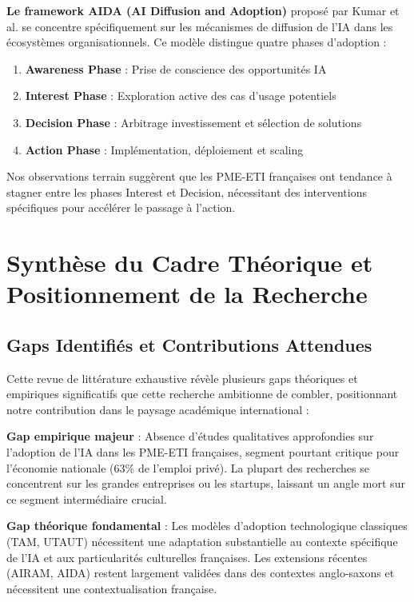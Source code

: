 \textbf{Le framework AIDA (AI Diffusion and Adoption)} proposé par Kumar et al. \cite{kumar2024aida} se concentre spécifiquement sur les mécanismes de diffusion de l'IA dans les écosystèmes organisationnels. Ce modèle distingue quatre phases d'adoption :

\begin{enumerate}
    \item \textbf{Awareness Phase} : Prise de conscience des opportunités IA
    \item \textbf{Interest Phase} : Exploration active des cas d'usage potentiels  
    \item \textbf{Decision Phase} : Arbitrage investissement et sélection de solutions
    \item \textbf{Action Phase} : Implémentation, déploiement et scaling
\end{enumerate}

Nos observations terrain suggèrent que les PME-ETI françaises ont tendance à stagner entre les phases Interest et Decision, nécessitant des interventions spécifiques pour accélérer le passage à l'action.

\section{Synthèse du Cadre Théorique et Positionnement de la Recherche}

\subsection{Gaps Identifiés et Contributions Attendues}

Cette revue de littérature exhaustive révèle plusieurs gaps théoriques et empiriques significatifs que cette recherche ambitionne de combler, positionnant notre contribution dans le paysage académique international :

\textbf{Gap empirique majeur} : Absence d'études qualitatives approfondies sur l'adoption de l'IA dans les PME-ETI françaises, segment pourtant critique pour l'économie nationale (63\% de l'emploi privé). La plupart des recherches se concentrent sur les grandes entreprises ou les startups, laissant un angle mort sur ce segment intermédiaire crucial.

\textbf{Gap théorique fondamental} : Les modèles d'adoption technologique classiques (TAM, UTAUT) nécessitent une adaptation substantielle au contexte spécifique de l'IA et aux particularités culturelles françaises. Les extensions récentes (AIRAM, AIDA) restent largement validées dans des contextes anglo-saxons et nécessitent une contextualisation française.

